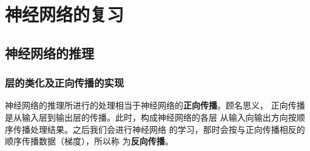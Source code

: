 \chapter{神经网络的复习\label{Ch01}}
\section{神经网络的推理}
\subsection{层的类化及正向传播的实现}

神经网络的推理所进行的处理相当于神经网络的\textbf{正向传播}。顾名思义，
正向传播是从输入层到输出层的传播。此时，构成神经网络的各层
从输入向输出方向按顺序传播处理结果。之后我们会进行神经网络
的学习，那时会按与正向传播相反的顺序传播数据（梯度），所以称
为\textbf{反向传播}。